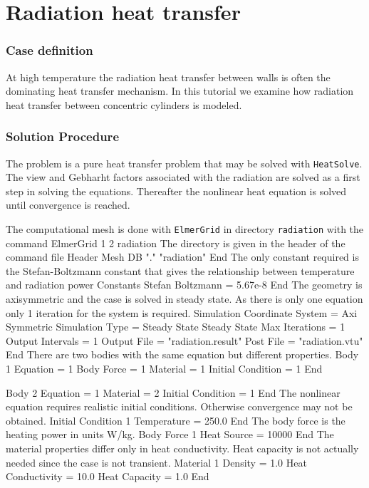 \chapter{Radiation heat transfer}


\subsection*{Case definition}

At high temperature the radiation heat transfer between walls 
is often the dominating heat transfer mechanism. In this
tutorial we examine how radiation heat transfer between 
concentric cylinders is modeled. 


\subsection*{Solution Procedure}

The problem is a pure heat transfer problem that may be solved
with \texttt{HeatSolve}. The view and Gebharht factors 
associated with the radiation are solved as a first step 
in solving the equations. Thereafter the nonlinear heat equation is solved
until convergence is reached.

The computational mesh is done with \texttt{ElmerGrid} in directory \texttt{radiation} 
with the command 
\ttbegin
ElmerGrid 1 2 radiation
\ttend
The directory is given in the header of the command file
\ttbegin
Header
  Mesh DB "." "radiation"
End
\ttend
%
The only constant required is the Stefan-Boltzmann constant that gives the
relationship between temperature and radiation power
\ttbegin
Constants
  Stefan Boltzmann = 5.67e-8
End
\ttend
%
The geometry is axisymmetric and the case is solved in steady state.
As there is only one equation only 1 iteration for the system is required.
\ttbegin
Simulation
  Coordinate System = Axi Symmetric
  Simulation Type = Steady State
  Steady State Max Iterations = 1
  Output Intervals = 1
  Output File = "radiation.result"
  Post File = "radiation.vtu"
End
\ttend
% 
There are two bodies with the same equation but different properties.
\ttbegin
Body 1
  Equation = 1
  Body Force = 1
  Material = 1
  Initial Condition = 1
End

Body 2
  Equation = 1
  Material = 2
  Initial Condition = 1
End
\ttend
%
The nonlinear equation requires realistic initial conditions. Otherwise convergence
may not be obtained.
\ttbegin
Initial Condition 1
  Temperature = 250.0
End
\ttend
The body force is the heating power in units W/kg. 
\ttbegin
Body Force 1
  Heat Source = 10000
End
\ttend
The material properties differ only in heat conductivity. Heat capacity is not
actually needed since the case is not transient.
\ttbegin
Material 1
   Density = 1.0
   Heat Conductivity = 10.0
   Heat Capacity = 1.0
End

